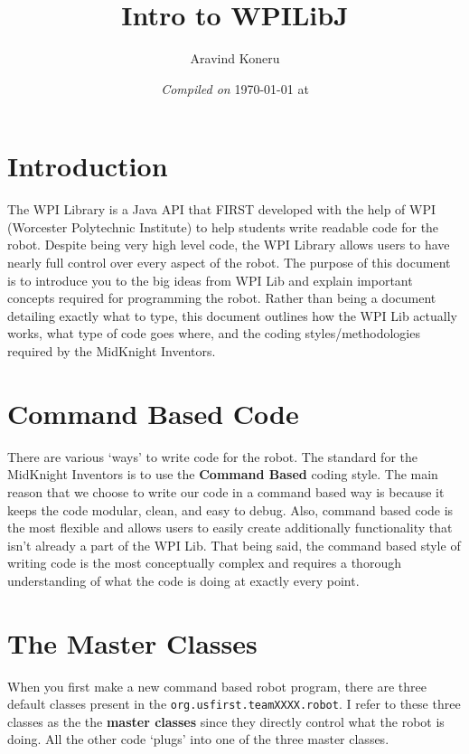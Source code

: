 \documentclass[11pt,fleqn]{article}
\begin{document}
\title{Intro to WPILibJ}%
\author{Aravind Koneru}
\date{\textit{Compiled on} \today \hspace{1mm} at \currenttime}
\maketitle

\section{Introduction}

The WPI Library is a Java API that FIRST developed with the help of WPI (Worcester Polytechnic Institute)
to help students write readable code for the robot. Despite being very high level code, the WPI Library
allows users to have nearly full control over every aspect of the robot. The purpose of this document
is to introduce you to the big ideas from WPI Lib and explain important concepts required for programming
the robot. Rather than being a document detailing exactly what to type, this document outlines how the
WPI Lib actually works, what type of code goes where, and the coding styles/methodologies required by
the MidKnight Inventors. 

\section{Command Based Code}

There are various `ways' to write code for the robot. The standard for the MidKnight Inventors is to use
the \textbf{Command Based} coding style. The main reason that we choose to write our code in a command
based way is because it keeps the code modular, clean, and easy to debug. Also, command based code is
the most flexible and allows users to easily create additionally functionality that isn't already a part
of the WPI Lib. That being said, the command based style of writing code is the most conceptually complex
and requires a thorough understanding of what the code is doing at exactly every point. 

\section{The Master Classes}

When you first make a new command based robot program, there are three default classes present in the
\texttt{org.usfirst.teamXXXX.robot}. I refer to these three classes as the the \textbf{master classes}
since they directly control what the robot is doing. All the other code `plugs' into one of the three
master classes. 
\end{document}
